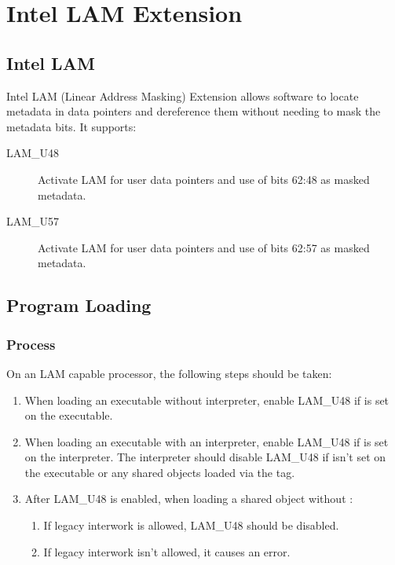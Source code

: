 \chapter{Intel LAM Extension}

\section{Intel LAM}

Intel LAM (Linear Address Masking) Extension allows software to locate
metadata in data pointers and dereference them without needing to mask
the metadata bits.  It supports:

\begin{description}
  \item[LAM_U48] Activate LAM for user data pointers and use of bits
    62:48 as masked metadata.
  \item[LAM_U57] Activate LAM for user data pointers and use of bits
    62:57 as masked metadata.
\end{description}

\section{Program Loading}

\subsection{Process }
\label{lam_u48}

On an LAM capable processor, the following steps should be taken:

\begin{enumerate}
  \item
    \begin{sloppypar}
      When loading an executable without interpreter, enable LAM_U48
      if  is set on the
      executable.
    \end{sloppypar}
  \item
    \begin{sloppypar}
      When loading an executable with an interpreter, enable LAM_U48
      if  is set on the
      interpreter.  The interpreter should disable LAM_U48 if
       isn't set on the
      executable or any shared objects loaded via the 
      tag.
    \end{sloppypar}
  \item
    \begin{sloppypar}
      After LAM_U48 is enabled, when loading a shared object without
      :
      \begin{enumerate}
	\item If legacy interwork is allowed, LAM_U48 should be disabled.
	\item If legacy interwork isn't allowed, it causes an error.
      \end{enumerate}
    \end{sloppypar}
\end{enumerate}

